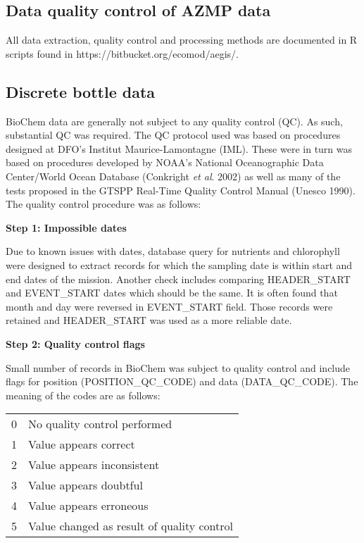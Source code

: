 \documentclass[letterpaper,portrait,11pt]{scrartcl}
\numberwithin{equation}{section}    %
\numberwithin{figure}{section}    %
\numberwithin{table}{section}       %
\begin{document}
\clearpage
\begin{appendices}
  
\section{Data quality control of AZMP data}

All data extraction, quality control and processing methods are documented in R scripts found in https://bitbucket.org/ecomod/aegis/.

\subsection{Discrete bottle data}

BioChem data are generally not subject to any quality control (QC). As such, substantial QC was required. The QC protocol used was based on procedures designed at DFO's Institut Maurice-Lamontagne (IML). These were in turn was based on procedures developed by NOAA's National Oceanographic Data Center/World Ocean Database (Conkright \textit{et al}. 2002) as well as many of the tests proposed in the GTSPP Real-Time Quality Control Manual (Unesco 1990). The quality control procedure was as follows:

\textbf{Step 1: Impossible dates}

Due to known issues with dates, database query for nutrients and chlorophyll were designed to extract records for which the sampling date is within start and end dates of the mission. Another check includes comparing HEADER\_START and EVENT\_START dates which should be the same. It is often found that month and day were reversed in EVENT\_START field. Those records were retained and HEADER\_START was used as a more reliable date.

\textbf{Step 2: Quality control flags}

Small number of records in BioChem was subject to quality control and  include flags for position (POSITION\_QC\_CODE) and data (DATA\_QC\_CODE). The meaning of the codes are as follows:

\begin{table} [h]
\begin{tabular}{ll}
0 & No quality control performed \\
1 & Value appears correct \\
2 & Value appears inconsistent \\
3 & Value appears doubtful \\
4 & Value  appears erroneous \\
5 & Value changed as result of quality control \\
\end{tabular}
\end{table}


\end{appendices}
\end{document}
